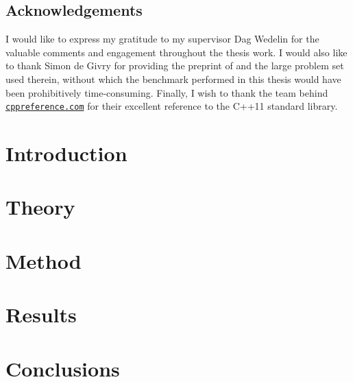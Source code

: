 \documentclass[paper=A4,DIV=calc]{scrbook}
\theoremstyle{plain}
\theoremstyle{definition}
\begin{document}
	\frontmatter
	\makefrontmatter[style=line]

	\cleardoublepage
	\section*{Acknowledgements}
	I would like to express my gratitude to my supervisor Dag Wedelin for the valuable comments and engagement throughout the thesis work.
	I would also like to thank Simon de Givry for providing the preprint of  \parencite{deGivry14} and the large problem set used therein, without which the benchmark performed in this thesis would have been prohibitively time-consuming.
	Finally, I wish to thank the team behind \href{http://en.cppreference.com/w/}{\nolinkurl{cppreference.com}} for their excellent reference to the C++11 standard library.

	\cleardoublepage
	\tableofcontents
	\cleardoublepage
	\printglossary[type=\acronymtype,]


	\mainmatter

	\chapter{Introduction}
	
	
	

	\glsresetall

	\chapter{Theory}
	
	
	

	\chapter{Method}
	
	
	

	\chapter{Results}
	
	
	
	

	\chapter{Conclusions}
	

	\printbibliography[heading=bibintoc]
	\backmatter
\end{document}
